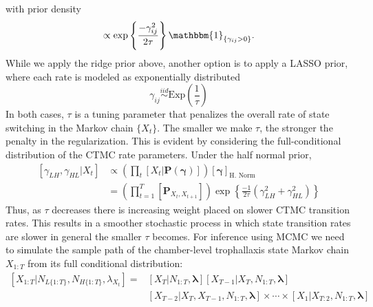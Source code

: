 \documentclass[cmbright,fleqn,referee]{envauth}
\begin{document}
with prior density
\begin{equation}
[\gamma_{ij}] \propto \text{exp}\left\{\frac{-\gamma_{ij}^2}{2 \tau}\right\} \mathbbm{1}_{\{\gamma_{ij} > 0\}}.
\end{equation}
While we apply the ridge prior above, another option is to apply a LASSO prior, where each rate is modeled as exponentially distributed
\begin{equation}
\gamma_{ij} \stackrel{iid}{\sim} \text{Exp}\left(\frac{1}{\tau}\right)
\end{equation}
In both cases, $\tau$ is a tuning parameter that penalizes the overall rate of state switching in the Markov chain $\{X_t\}$. The smaller we make $\tau$, the stronger the penalty in the regularization. This is evident by considering the full-conditional distribution of the CTMC rate parameters.
Under the half normal prior, 
\begin{align}
\left[ \gamma_{LH}, \gamma_{HL} |X_t \right]
 &\propto \left(\prod_t [X_t | \mathbf{P}(\bm{\gamma})]\right) [\bm{\gamma}]_{\text{H. Norm}} \\
    &= \left(\prod_{t = 1}^T [\mathbf{P}_{X_t, X_{t+1}}]\right)  \exp\left\{\frac{-1}{2\tau} (\gamma_{LH}^2 + \gamma_{HL}^2) \right\}
\end{align}
Thus, as $\tau$ decreases there is increasing weight placed on slower CTMC transition rates. This results in a smoother stochastic process in which state transition rates are slower in general the smaller $\tau$ becomes.
For inference using MCMC we need to simulate the sample path of the chamber-level trophallaxis state Markov chain $X_{1:T}$ from its full conditional distribution:
\begin{equation}
\begin{split}
[X_{1:T}|N_{L\{1:T\}}, N_{H\{1:T\}}, \lambda_{X_t}] = &[X_T|N_{1:T}, \bm{\lambda}] [X_{T-1} | X_T, N_{1:T}, \bm{\lambda}]\\
&[X_{T-2} | X_T, X_{T-1}, N_{1:T}, \bm{\lambda}] \times \cdots \times [X_1|X_{T:2}, N_{1:T}, \bm{\lambda}]
\end{split}
\end{equation}
\end{document}
